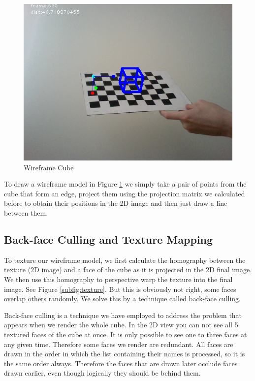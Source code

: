 \begin{figure}[h!]
	\centering
	\includegraphics[width=\textwidth]{final/images/wireframe.png}
	\caption{Wireframe Cube}
	\label{fig:wireframe}
\end{figure}

To draw a wireframe model in Figure \ref{fig:wireframe} we simply take a pair of points from the cube that form an edge, project them using the projection matrix we calculated before to obtain their positions in the 2D image and then just draw a line between them.

\subsection{Back-face Culling and Texture Mapping}

To texture our wireframe model, we first calculate the homography between the texture (2D image) and a face of the cube as it is projected in the 2D final image. We then use this homography to perspective warp the texture into the final image. See Figure \ref{subfig:texture}. But this is obviously not right, some faces overlap others randomly. We solve this by a technique called back-face culling.

Back-face culling is a technique we have employed to address the problem that appears when we render the whole cube. In the 2D view you can not see all 5 textured faces of the cube at once. It is only possible to see one to three faces at any given time. Therefore some faces we render are redundant. All faces are drawn in the order in which the list containing their names is processed, so it is the same order always. Therefore the faces that are drawn later occlude faces drawn earlier, even though logically they should be behind them. 

